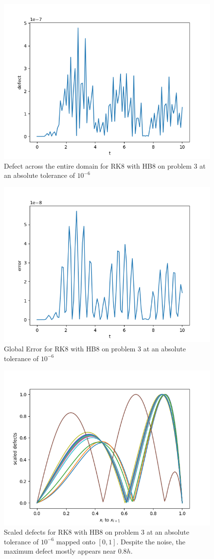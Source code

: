\begin{figure}[H]
\centering
\includegraphics[width=0.7\linewidth]{./figures/rk8_with_hb8_p3_global_defect}
\caption{Defect across the entire domain for RK8 with HB8 on problem 3 at an absolute tolerance of $10^{-6}$}
\label{fig:rk8_with_hb8_p3_global_defect}
\end{figure}

\begin{figure}[H]
\centering
\includegraphics[width=0.7\linewidth]{./figures/rk8_with_hb8_p3_global_error}
\caption{Global Error for RK8 with HB8 on problem 3 at an absolute tolerance of $10^{-6}$}
\label{fig:rk8_with_hb8_p3_global_error}
\end{figure}

\begin{figure}[H]
\centering
\includegraphics[width=0.7\linewidth]{./figures/rk8_with_hb8_p3_scaled_defects}
\caption{Scaled defects for RK8 with HB8 on problem 3 at an absolute tolerance of $10^{-6}$  mapped onto $[0, 1]$. Despite the noise, the maximum defect mostly appears near $0.8h$.}
\label{fig:rk8_with_hb8_p3_scaled_defects}
\end{figure}

